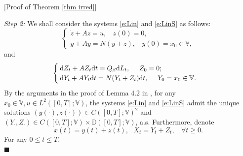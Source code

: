 \documentclass[12pt,a4paper]{article}
\theoremstyle{definition}
\theoremstyle{remark}
\numberwithin{equation}{section}
\newcommand{\DD}{\mathbb{D}}
\newcommand{\HH}{\mathbb{H}}
\newcommand{\VV}{\mathbb{V}}
\newcommand{\dif}{{\rm d}}
\newenvironment{proof}{\par\noindent{\bf Proof:}}{\hspace*{\fill}$\blacksquare$\par}
\begin{document}
{\begin{proof}[Proof of Theorem \ref{thm irred}]
\vskip0.3cm

\emph{Step 2:}
We shall consider the systems \eqref{e:Lin} and \eqref{e:LinS}
as follows:
 \begin{equation}\label{e:Lin}
    \begin{cases}
 \dot z+A z=u, \ \ \ \ z(0)=0, \\
\dot y+A y=N(y+z), \ \ \ \ y(0)=x_0\in \VV,
\end{cases} \end{equation}
and
 \begin{equation}\label{e:LinS}
    \begin{cases}
\dif Z_t+A Z_t \dif t= Q_{\beta}\dif L_t, \ \ \ \ Z_0=0;\\
\dif Y_t+A Y_t\dif t=N(Y_t+Z_t)\dif t, \ \ \ \ Y_0=x_0\in \VV.
 \end{cases} \end{equation}
By the arguments in the proof of Lemma 4.2 in \cite{Xu13}, for any $x_0\in \VV, u\in L^2([0,T];\VV)$, the systems \eqref{e:Lin} and \eqref{e:LinS} admit the unique solutions $(y(\cdot), z(\cdot)) \in  C([0,T];\VV)^2$ and $(Y_{\cdot}, Z_{\cdot}) \in   C([0,T];\VV)\times \DD([0,T];\VV)$, a.s.
 Furthermore, denote
$$
x(t)=y(t)+z(t),\ \ \ X_t=Y_t+Z_t,\ \ \ \ \forall t\ge0.
$$
For any $0 \le t\le T$,
\begin{align*}

\end{align*}
\end{proof}}
\end{document}
